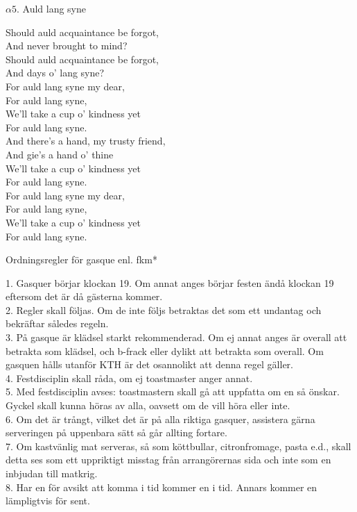 \documentclass[a6paper,10pt]{article}
\begin{document}
\setlength{\oddsidemargin}{-0.37in}
\begin{center}
\Large $\alpha5$. Auld lang syne \\
\end{center}
Should auld acquaintance be forgot, \\
And never brought to mind? \\
Should auld acquaintance be forgot, \\
And days o' lang syne? \\
For auld lang syne my dear, \\
For auld lang syne, \\
We'll take a cup o' kindness yet \\
For auld lang syne. 
\vspace{5pt}\\
And there's a hand, my trusty friend, \\
And gie's a hand o' thine \\
We'll take a cup o' kindness yet \\
For auld lang syne. \\
For auld lang syne my dear, \\
For auld lang syne, \\
We'll take a cup o' kindness yet \\
For auld lang syne. 

\setlength{\oddsidemargin}{-0.47in}
\begin{center}
\large Ordningsregler för gasque enl. fkm*
\end{center}
\small
1. Gasquer börjar klockan 19. Om annat anges börjar festen ändå klockan 19 eftersom det är då gästerna kommer. \vspace{5pt} \\
2. Regler skall följas. Om de inte följs betraktas det som ett undantag och bekräftar således regeln.
\vspace{5pt} \\
3. På gasque är klädsel starkt rekommenderad. Om ej annat anges är overall att betrakta som klädsel, och b-frack eller dylikt att betrakta som overall. Om gasquen hålls utanför KTH är det osannolikt att denna regel gäller.
\vspace{5pt} \\
4. Festdisciplin skall råda, om ej toastmaster anger annat.
\vspace{5pt} \\
5. Med festdisciplin avses: toastmastern skall gå att uppfatta om en så önskar. Gyckel skall kunna höras av alla, oavsett om de vill höra eller inte.
\vspace{5pt} \\
6. Om det är trångt, vilket det är på alla riktiga gasquer, assistera gärna serveringen på uppenbara sätt så går allting fortare.
\vspace{5pt} \\
7. Om kastvänlig mat serveras, så som köttbullar, citronfromage, pasta e.d., skall detta ses som ett uppriktigt misstag från arrangörernas sida och inte som en inbjudan till matkrig.
\vspace{5pt} \\
8. Har en för avsikt att komma i tid kommer en i tid. Annars kommer en lämpligtvis för sent.
\end{document}
